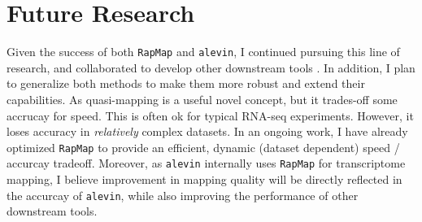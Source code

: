 \documentclass[11pt,a4paper,sans]{moderncv} %
\newcommand{\qm}{quasi-mapping\xspace}
\newcommand{\rapmap}{\texttt{RapMap}\xspace}
\newcommand{\alevin}{\texttt{alevin}\xspace}
\begin{document}
\section{Future Research}
Given the success of both \rapmap and \alevin, I continued pursuing this line of research, and 
collaborated to develop other downstream tools \cite{rapclust, ddfact, pufferfish, swish, minnow}. 
In addition, I plan to generalize both methods to make them more robust and extend their capabilities. 
As \qm is a useful novel concept, but it trades-off some accrucay for speed. This is often ok for typical 
RNA-seq experiments. However, it loses accuracy in \textit{relatively} complex datasets. 
In an ongoing work, I have already optimized \rapmap to provide an efficient, dynamic (dataset dependent) 
speed / accurcay tradeoff. Moreover, as \alevin internally uses \rapmap for transcriptome mapping, I believe 
improvement in mapping quality will be directly reflected in the accurcay of \alevin, while also improving the 
performance of other downstream tools.
\end{document}
